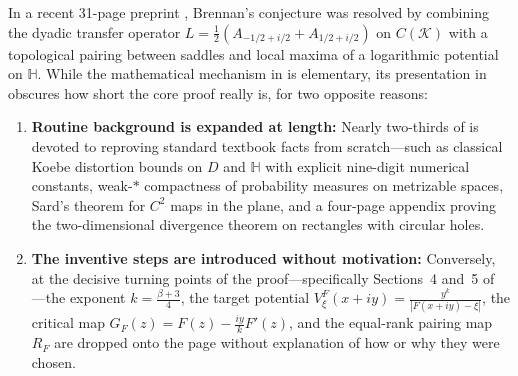 \documentclass[12pt]{article}
\def\H{\mathbb{H}}
\def\K{\mathcal{K}}
\theoremstyle{definition}
\numberwithin{equation}{section}
\begin{document}
In a recent 31-page preprint \cite{OAI26}, Brennan's conjecture was resolved by combining the dyadic transfer operator $L = \frac{1}{2}(A_{-1/2+i/2} + A_{1/2+i/2})$ on $C(\K)$ with a topological pairing between saddles and local maxima of a logarithmic potential on $\H$. While the mathematical mechanism in \cite{OAI26} is elementary, its presentation in \cite{OAI26} obscures how short the core proof really is, for two opposite reasons:
\begin{enumerate}
  \item \textbf{Routine background is expanded at length:} Nearly two-thirds of \cite{OAI26} is devoted to reproving standard textbook facts from scratch---such as classical Koebe distortion bounds on $D$ and $\H$ with explicit nine-digit numerical constants, weak-$*$ compactness of probability measures on metrizable spaces, Sard's theorem for $C^2$ maps in the plane, and a four-page appendix proving the two-dimensional divergence theorem on rectangles with circular holes.
  \item \textbf{The inventive steps are introduced without motivation:} Conversely, at the decisive turning points of the proof---specifically Sections~4 and~5 of \cite{OAI26}---the exponent $k = \frac{\beta+3}{4}$, the target potential $V_\xi^F(x+iy) = \frac{y^k}{|F(x+iy)-\xi|}$, the critical map $G_F(z) = F(z) - \frac{iy}{k}F'(z)$, and the equal-rank pairing map $R_F$ are dropped onto the page without explanation of how or why they were chosen.
\end{enumerate}
\end{document}
